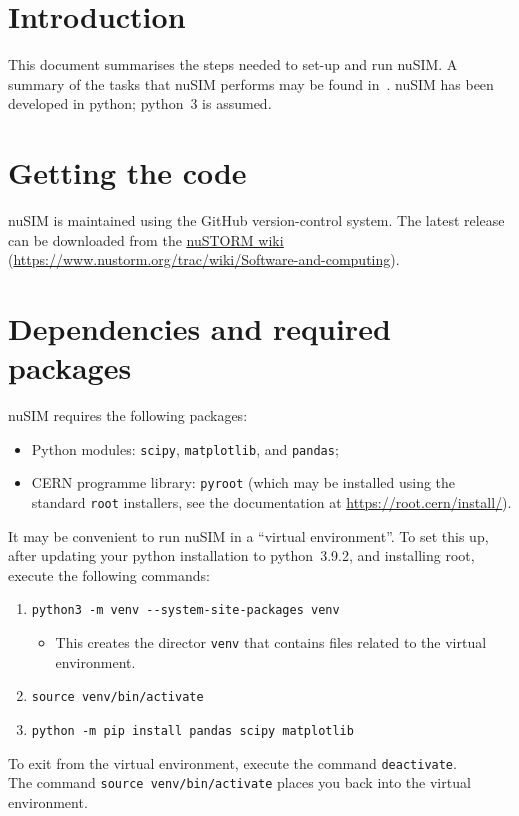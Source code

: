 \section*{Introduction}
This document summarises the steps needed to set-up and run nuSIM.
A summary of the tasks that nuSIM performs may be found
in~\cite{2021:nuSIM:Doc.01}.
nuSIM has been developed in python; python~3 is assumed.

\section*{Getting the code}
nuSIM is maintained using the GitHub version-control system.
The latest release can be downloaded from the
\href{https://www.nustorm.org}{\underline{\color{blue} nuSTORM wiki}}
(\href{https://www.nustorm.org/trac/wiki/Software-and-computing}{\underline{\color{blue}}https://www.nustorm.org/trac/wiki/Software-and-computing}).

\section*{Dependencies and required packages}
nuSIM requires the following packages:
\begin{itemize}
  \item Python modules: \verb+scipy+, \verb+matplotlib+, and
    \verb+pandas+;
  \item CERN programme library: \verb+pyroot+ (which may be installed
    using the standard \verb+root+ installers, see the documentation
    at \href{https://root.cern/install/}{\underline{\color{blue}https://root.cern/install/}}).
\end{itemize}
It may be convenient to run nuSIM in a ``virtual environment''.
To set this up, after updating your python installation to python~3.9.2,
and installing root, execute the following commands:
\begin{enumerate}
  \item \verb+python3 -m venv --system-site-packages venv+
    \begin{itemize}
      \item This creates the director \verb+venv+ that contains files
        related to the virtual environment.
    \end{itemize}
  \item \verb+source venv/bin/activate+
  \item \verb+python -m pip install pandas scipy matplotlib+
\end{enumerate}
To exit from the virtual environment, execute the command
\verb+deactivate+. \\
\noindent
The command \verb+source venv/bin/activate+ places you back
into the virtual environment.


